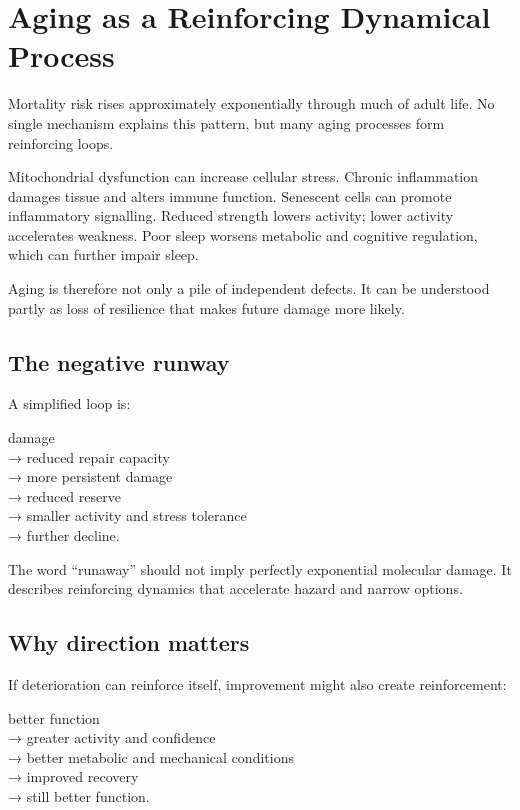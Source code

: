 \chapter{Aging as a Reinforcing Dynamical Process}

Mortality risk rises approximately exponentially through much of adult life. No single mechanism explains this pattern, but many aging processes form reinforcing loops.

Mitochondrial dysfunction can increase cellular stress. Chronic inflammation damages tissue and alters immune function. Senescent cells can promote inflammatory signalling. Reduced strength lowers activity; lower activity accelerates weakness. Poor sleep worsens metabolic and cognitive regulation, which can further impair sleep.

Aging is therefore not only a pile of independent defects. It can be understood partly as loss of resilience that makes future damage more likely.

\section{The negative runway}

A simplified loop is:

damage\\
→ reduced repair capacity\\
→ more persistent damage\\
→ reduced reserve\\
→ smaller activity and stress tolerance\\
→ further decline.

The word ``runaway'' should not imply perfectly exponential molecular damage. It describes reinforcing dynamics that accelerate hazard and narrow options.

\section{Why direction matters}

If deterioration can reinforce itself, improvement might also create reinforcement:

better function\\
→ greater activity and confidence\\
→ better metabolic and mechanical conditions\\
→ improved recovery\\
→ still better function.


